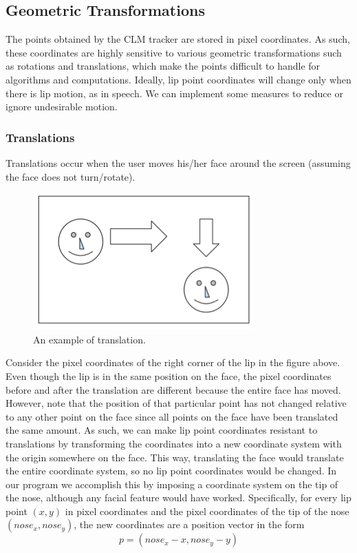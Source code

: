 \documentclass[10pt,twocolumn,letterpaper]{article}
\begin{document}
\subsection{Geometric Transformations}
The points obtained by the CLM tracker are stored in pixel coordinates. As such, these coordinates are highly sensitive to various geometric transformations such as rotations and translations, which make the points difficult to handle for algorithms and computations. Ideally, lip point coordinates will change only when there is lip motion, as in speech. We can implement some measures to reduce or ignore undesirable motion.
\subsubsection{Translations}
Translations occur when the user moves his/her face around the screen (assuming the face does not turn/rotate).

\begin{figure}[h]
\centering
\includegraphics{bo2}
\caption{An example of translation.}
\end{figure}

Consider the pixel coordinates of the right corner of the lip in the figure above. Even though the lip is in the same position on the face, the pixel coordinates before and after the translation are different because the entire face has moved. However, note that the position of that particular point has not changed relative to any other point on the face since all points on the face have been translated the same amount. As such, we can make lip point coordinates resistant to translations by transforming the coordinates into a new coordinate system with the origin somewhere on the face. This way, translating the face would translate the entire coordinate system, so no lip point coordinates would be changed.
In our program we accomplish this by imposing a coordinate system on the tip of the nose, although any facial feature would have worked. Specifically, for every lip point $(x, y)$ in pixel coordinates and the pixel coordinates of the tip of the nose $(nose_x, nose_y)$, the new coordinates are a position vector in the form
\begin{equation}
  p = (nose_x - x, nose_y - y)
\end{equation}
\end{document}
